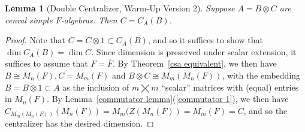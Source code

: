 \documentclass[12pt]{report}
\theoremstyle{plain}
\newtheorem{lem}[thm]{Lemma}
\newcommand{\ov}{\overline}
\begin{document}
\begin{lem}[Double Centralizer, Warm-Up Version 2] \label{dc2} 
Suppose $A = B \otimes C$ are cenral simple $F$-algebras. Then $C =
C_A(B)$.
\end{lem}
\begin{proof}
Note that $C = C \otimes 1 \subset C_A(B)$, and so it suffices to show that
$\dim C_A(B) = \dim C$. Since dimension is preserved under scalar
extension, it suffices to assume that $F = \ov F$. By Theorem~\ref{csa
equivalent}, we then have $B \cong M_n(F), C = M_m(F)$ and $B \otimes C
\cong M_m(M_n(F))$, with the embedding $B = B \otimes 1 \subset A$ as the
inclusion of $m \bigtimes m$ ``scalar'' matrices with (equal) entries in
$M_n(F)$. By Lemma~\ref{commutator lemma}(\ref{commutator 1}), we then have
$C_{M_m(M_n(F))}(M_n(F)) = M_m(Z(M_n(F)) = M_m(F) = C$, and so the
centralizer has the desired dimension.
\end{proof}
\end{document}
